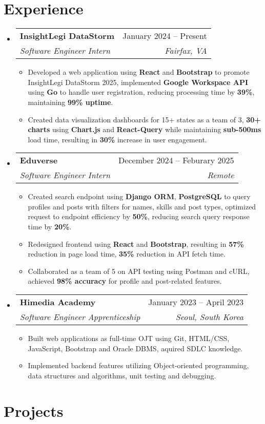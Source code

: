 \documentclass[letterpaper,11pt]{article}
\makeatletter
\newcommand{\resumeItem}[1]{
  \item\small{
    {#1 \vspace{0pt}}
  }
}
\newcommand{\resumeSubheading}[4]{
    \item
    \begin{tabular*}{0.985\textwidth}[t]{l@{\extracolsep{\fill}}r@{\hspace{-0.1in}}}
        \small{\textbf{#1}} & \small{#2} \\
        \textit{\small#3} & \textit{\small #4} \\
    \end{tabular*}\vspace{-5pt}
}
\newcommand{\resumeSubHeadingListStart}{\begin{itemize}[leftmargin=0.00in, rightmargin=-0.2in, label={}]\vspace{1pt}}
\newcommand{\resumeSubHeadingListEnd}{\end{itemize}\vspace{-9pt}}
\newcommand{\resumeItemListStart}{\begin{itemize}[leftmargin=0.15in, rightmargin=0.15in]}
\newcommand{\resumeItemListEnd}{\end{itemize}\vspace{-5pt}}
\makeatother
\begin{document}
\section{Experience}

\resumeSubHeadingListStart
\resumeSubheading
{InsightLegi DataStorm} {January 2024 -- Present}
{Software Engineer Intern} {Fairfax, VA}
\resumeItemListStart 
\resumeItem{Developed a web application using \textbf{React} and \textbf{Bootstrap} to promote InsightLegi DataStorm 2025, implemented \textbf{Google Workspace API} using \textbf{Go} to handle user registration, reducing processing time by \textbf{39\%}, maintaining \textbf{99\% uptime}.}
\resumeItem{Created data visualization dashboards for 15+ states as a team of 3, \textbf{30+ charts} using \textbf{Chart.js} and \textbf{React-Query} while maintaining \textbf{sub-500ms} load time, resulting in \textbf{30\%} increase in user engagement.}
\resumeItemListEnd
\resumeSubHeadingListEnd

\resumeSubHeadingListStart
\resumeSubheading
{Eduverse} {December 2024 -- Feburary 2025}
{Software Engineer Intern} {Remote}
\resumeItemListStart
\resumeItem{Created search endpoint using \textbf{Django ORM}, \textbf{PostgreSQL} to query profiles and posts with filters for names, skills and post types, optimized request to endpoint efficiency by \textbf{50\%}, reducing search query response time by \textbf{20\%}.}
\resumeItem{Redesigned frontend using \textbf{React} and \textbf{Bootstrap}, resulting in \textbf{57\%} reduction in page load time, \textbf{35\%} reduction in API fetch time.}
\resumeItem{Collaborated as a team of 5 on API testing using Postman and cURL, achieved \textbf{98\% accuracy} for profile and post-related features.}
\resumeItemListEnd
\resumeSubHeadingListEnd

\resumeSubHeadingListStart
\resumeSubheading
{Himedia Academy} {January 2023 -- April 2023}
{Software Engineer Apprenticeship} {Seoul, South Korea}
\resumeItemListStart
\resumeItem{Built web applications as full-time OJT using Git, HTML/CSS, JavaScript, Bootstrap and Oracle DBMS, aquired SDLC knowledge.}
\resumeItem{Implemented backend features utilizing Object-oriented programming, data structures and algorithms, unit testing and debugging.}
\resumeItemListEnd
\resumeSubHeadingListEnd


\section{Projects}
\end{document}
